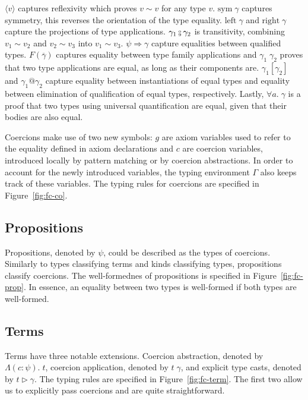 $\langle v \rangle$ captures reflexivity which proves $v \sim v$ for any
type $v$. $\text{sym} \; \gamma$ captures symmetry, this reverses the
orientation of the type equality. $\text{left} \; \gamma$ and $\text{right} \;
\gamma$ capture the projections of type applications.
$\gamma_1 \fctrans \gamma_2$ is transitivity, combining $v_1 \sim v_2$ and $v_2
\sim v_3$ into $v_1 \sim v_3$. $\psi \Rightarrow \gamma$ capture equalities
between qualified types. $F(\overline{\gamma})$ captures equality between type
family applications and $\gamma_1 \; \gamma_2$ proves that two type
applications are equal, as long as their components are.
$\gamma_1[\gamma_2]$ and $\gamma_1@\gamma_2$ capture equality between
instantiations of equal types and equality between elimination of qualification
of equal types, respectively. Lastly, $\forall a. \; \gamma$ is a proof that
two types using universal quantification are equal, given that their bodies are
also equal.

Coercions make use of two new symbols: $g$ are axiom variables used to refer to the
equality defined in axiom declarations and $c$ are coercion variables, introduced
locally by pattern matching or by coercion abstractions. In order to account for the
newly introduced variables, the typing environment $\Gamma$ also keeps track
of these variables. The typing rules for coercions are specified in
Figure~\ref{fig:fc-co}.

\subsection{Propositions}

Propositions, denoted by $\psi$, could be described as the types of coercions.
Similarly to types classifying terms and kinds classifying types, propositions
classify coercions.  The well-formednes of propositions is specified in
Figure~\ref{fig:fc-prop}. In essence, an equality between two types is well-formed
if both types are well-formed.

\subsection{Terms}

Terms have three notable extensions. Coercion abstraction, denoted by $\Lambda(c
: \psi). \; t$, coercion application, denoted by $t \; \gamma$, and explicit
type casts, denoted by $t \triangleright \gamma$. The typing rules are specified
in Figure~\ref{fig:fc-term}. The first two allow us to explicitly pass coercions
and are quite straightforward.

